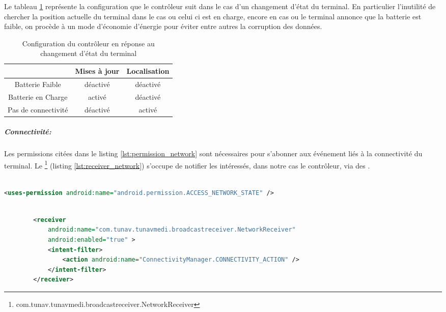 Le tableau \ref{tab:status} représente la configuration que le contrôleur suit dans le cas d'un changement d’état du terminal. En particulier l'inutilité de chercher la position actuelle du terminal dans le cas ou celui ci est en charge, encore en cas ou le terminal annonce que la batterie est faible, on procède à un mode d’économie d’énergie pour éviter entre autres la corruption des données.

\begin{table}[H]
\centering
\begin{tabular}{|c|c|c|}
\hline
&\textsf{Mises à jour} & \textsf{Localisation}\\
\hline
\textsf{Batterie Faible} & déactivé & déactivé\\
\hline
\textsf{Batterie en Charge} & activé & déactivé\\
\hline
\textsf{Pas de connectivité} & déactivé & activé\\
\hline
\end{tabular}
\caption{Configuration du contrôleur en réponse au changement d’état du terminal}
\label{tab:status}
\end{table}

\subparagraph{Connectivité:}

Les permissions citées dans le listing \ref{lst:permission_network} sont nécessaires pour s’abonner aux événement liés à la connectivité du terminal. Le \footnote{com.tunav.tunavmedi.broadcastreceiver.NetworkReceiver} (listing \ref{lst:receiver_network}) s'occupe de notifier les intéressés, dans notre cas le contrôleur, via des .

\begin{lstlisting}[language=xml, label=lst:permission_network, caption=Déclaration dans AndroidManifest des permissions d’accès à l’état des interfaces réseaux.]

<uses-permission android:name="android.permission.ACCESS_NETWORK_STATE" />

\end{lstlisting}

\begin{lstlisting}[language=xml, label=lst:receiver_network, caption=Déclaration dans AndroidManifest du  NetworkReceiver]

        <receiver
            android:name="com.tunav.tunavmedi.broadcastreceiver.NetworkReceiver"
            android:enabled="true" >
            <intent-filter>
                <action android:name="ConnectivityManager.CONNECTIVITY_ACTION" />
            </intent-filter>
        </receiver>

\end{lstlisting}

